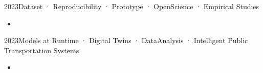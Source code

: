  {2023}{Dataset · Reproducibility · Prototype · OpenScience · Empirical Studies}{}
{\begin{itemize}
\item {}
\end{itemize}}
 {2023}{Models at Runtime · Digital Twins · DataAnalysis · Intelligent Public Transportation Systems}{}
{\begin{itemize}
\item {}
\end{itemize}}